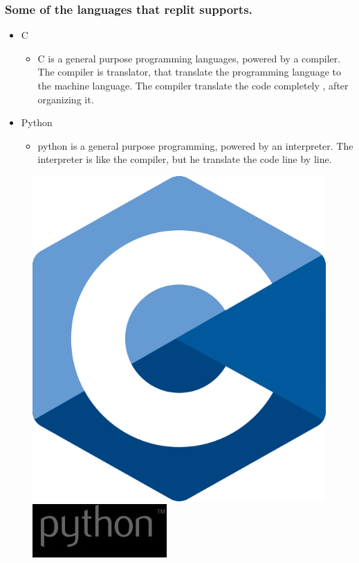 \documentclass[a4paper,11pt]{report}
\begin{document}
\subsubsection{Some of the languages that replit supports.}

\begin{itemize}
    \item C
    \begin{itemize}
         \item C is a general purpose programming languages, powered by a compiler. The compiler is translator, that translate the programming language to the machine language. The compiler translate the code completely , after organizing it.
\end{itemize}
\end{itemize}
\begin{itemize}
    \item Python
    \begin{itemize}
        \item python is a general purpose programming, powered by an interpreter. The interpreter is like the compiler, but he translate the code line by line.
\end{itemize}
\end{itemize}
\begin{figure}[!h]
    \centering
    \includegraphics[scale=0.075]{img14.png}
    \hspace{3cm}
    \includegraphics[scale=0.5]{img15.jpeg}
    
\end{figure}
\clearpage
\end{document}
